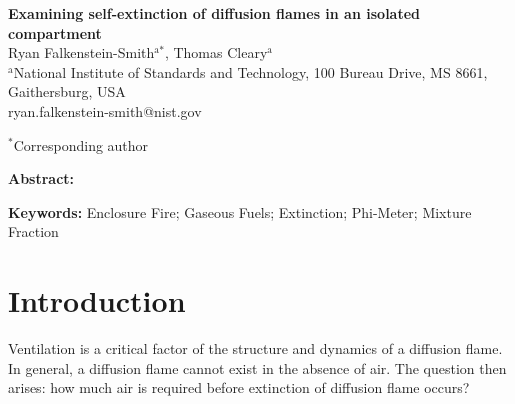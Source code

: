 \documentclass[12pt,letterpaper]{article}
\begin{document}
\begin{flushleft} %

\textbf{Examining self-extinction of diffusion flames in an isolated compartment}
\vspace{3mm}\\
%
Ryan Falkenstein-Smith$^\text{a*}$, Thomas Cleary$^\text{a}$
\vspace{3mm}\\	

$^\text{a}$National Institute of Standards and Technology, 100 Bureau Drive, MS 8661, Gaithersburg, USA  \\
ryan.falkenstein-smith@nist.gov
\vspace{3mm}

$^*$Corresponding author


\textbf{Abstract:}

\vspace{3mm}


\textbf{Keywords:}
Enclosure Fire; Gaseous Fuels; Extinction; Phi-Meter; Mixture Fraction

\section{Introduction} \addvspace{10pt}
\label{sec:introduction}
Ventilation is a critical factor of the structure and dynamics of a diffusion flame. In general, a diffusion flame cannot exist in the absence of air. The question then arises: how much air is required before extinction of diffusion flame occurs?


\end{flushleft}
\end{document}

